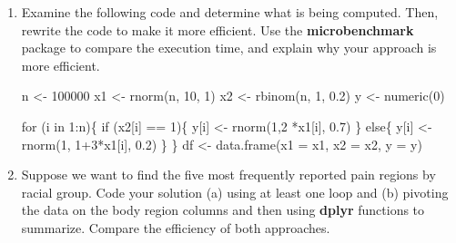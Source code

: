 \documentclass[
  letterpaper,
]{latex/krantz}
\makeatletter
\newenvironment{Shaded}{\begin{snugshade}}{\end{snugshade}}
\newcommand{\AttributeTok}[1]{\textcolor[rgb]{0.40,0.45,0.13}{#1}}
\newcommand{\CommentTok}[1]{\textcolor[rgb]{0.37,0.37,0.37}{#1}}
\newcommand{\ConstantTok}[1]{\textcolor[rgb]{0.56,0.35,0.01}{#1}}
\newcommand{\ControlFlowTok}[1]{\textcolor[rgb]{0.00,0.23,0.31}{#1}}
\newcommand{\DecValTok}[1]{\textcolor[rgb]{0.68,0.00,0.00}{#1}}
\newcommand{\FloatTok}[1]{\textcolor[rgb]{0.68,0.00,0.00}{#1}}
\newcommand{\FunctionTok}[1]{\textcolor[rgb]{0.28,0.35,0.67}{#1}}
\newcommand{\NormalTok}[1]{\textcolor[rgb]{0.00,0.23,0.31}{#1}}
\newcommand{\OtherTok}[1]{\textcolor[rgb]{0.00,0.23,0.31}{#1}}
\newcommand{\SpecialCharTok}[1]{\textcolor[rgb]{0.37,0.37,0.37}{#1}}
\newcommand{\StringTok}[1]{\textcolor[rgb]{0.13,0.47,0.30}{#1}}
\newenvironment{kframe}{%
\medskip{}
\setlength{\fboxsep}{.8em}
 \def\at@end@of@kframe{}%
 \ifinner\ifhmode%
  \def\at@end@of@kframe{\end{minipage}}%
  \begin{minipage}{\columnwidth}%
 \fi\fi%
 \def\FrameCommand##1{\hskip\@totalleftmargin \hskip-\fboxsep
 \colorbox{shadecolor}{##1}\hskip-\fboxsep
     \hskip-\linewidth \hskip-\@totalleftmargin \hskip\columnwidth}%
 \MakeFramed {\advance\hsize-\width
   \@totalleftmargin\z@ \linewidth\hsize
   \@setminipage}}%
 {\par\unskip\endMakeFramed%
 \at@end@of@kframe}
\renewenvironment{Shaded}{\begin{kframe}}{\end{kframe}}
\makeatother
\begin{document}
\begin{enumerate}
\begin{Shaded}
\end{Shaded}
\item
  Examine the following code and determine what is being computed. Then,
  rewrite the code to make it more efficient. Use the
  \textbf{microbenchmark} package to compare the execution time, and
  explain why your approach is more efficient.

\begin{Shaded}
\begin{Highlighting}[]
\NormalTok{n }\OtherTok{\textless{}{-}} \DecValTok{100000}
\NormalTok{x1 }\OtherTok{\textless{}{-}} \FunctionTok{rnorm}\NormalTok{(n, }\DecValTok{10}\NormalTok{, }\DecValTok{1}\NormalTok{)}
\NormalTok{x2 }\OtherTok{\textless{}{-}} \FunctionTok{rbinom}\NormalTok{(n, }\DecValTok{1}\NormalTok{, }\FloatTok{0.2}\NormalTok{)}
\NormalTok{y }\OtherTok{\textless{}{-}} \FunctionTok{numeric}\NormalTok{(}\DecValTok{0}\NormalTok{)}

\ControlFlowTok{for}\NormalTok{ (i }\ControlFlowTok{in} \DecValTok{1}\SpecialCharTok{:}\NormalTok{n)\{}
  \ControlFlowTok{if}\NormalTok{ (x2[i] }\SpecialCharTok{==} \DecValTok{1}\NormalTok{)\{}
\NormalTok{    y[i] }\OtherTok{\textless{}{-}} \FunctionTok{rnorm}\NormalTok{(}\DecValTok{1}\NormalTok{,}\DecValTok{2} \SpecialCharTok{*}\NormalTok{x1[i], }\FloatTok{0.7}\NormalTok{)}
\NormalTok{  \} }\ControlFlowTok{else}\NormalTok{\{}
\NormalTok{    y[i] }\OtherTok{\textless{}{-}} \FunctionTok{rnorm}\NormalTok{(}\DecValTok{1}\NormalTok{, }\DecValTok{1}\SpecialCharTok{+}\DecValTok{3}\SpecialCharTok{*}\NormalTok{x1[i], }\FloatTok{0.2}\NormalTok{)}
\NormalTok{  \}}
\NormalTok{\}}
\NormalTok{df }\OtherTok{\textless{}{-}} \FunctionTok{data.frame}\NormalTok{(}\AttributeTok{x1 =}\NormalTok{ x1, }\AttributeTok{x2 =}\NormalTok{ x2, }\AttributeTok{y =}\NormalTok{ y)}
\end{Highlighting}
\end{Shaded}
\item
  Suppose we want to find the five most frequently reported pain regions
  by racial group. Code your solution (a) using at least one loop and
  (b) pivoting the data on the body region columns and then using
  \textbf{dplyr} functions to summarize. Compare the efficiency of both
  approaches.
\end{enumerate}
\end{document}
